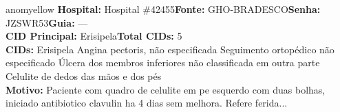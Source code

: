 \documentclass[a4paper,10pt]{article}
\begin{document}
\begin{anomalycard}[Interna\c{c}\~{a}o \#119017 | Pac. \#98715 | MODERADO (z=2.14) | LOS: 7d | 27/02/2026\,$\to$\,06/03/2026]{anomyellow}
\textbf{Hospital:} Hospital \#42455\quad \textbf{Fonte:} GHO-BRADESCO\quad \textbf{Senha:} JZSWR53\quad \textbf{Guia:} ---\\

\textbf{CID Principal:} {\small Erisipela}\quad\textbf{Total CIDs:} 5\\

\textbf{CIDs:} {\scriptsize Erisipela \textbar{} Angina pectoris, não especificada \textbar{} Seguimento ortopédico não especificado \textbar{} Úlcera dos membros inferiores não classificada em outra parte \textbar{} Celulite de dedos das mãos e dos pés}\\

\textbf{Motivo:} {\scriptsize Paciente com quadro de celulite em pe esquerdo com duas bolhas, iniciado antibiotico clavulin ha 4 dias sem melhora. Refere ferida...}\\

\end{anomalycard}
\end{document}
